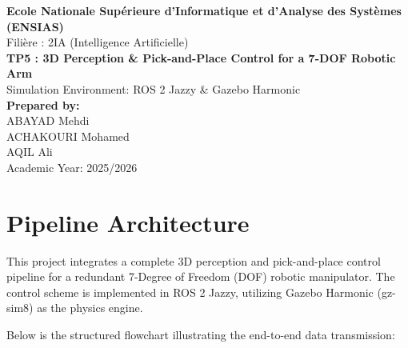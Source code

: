 \documentclass[12pt, a4paper]{article}
\begin{document}
\begin{titlepage}
    \centering
    \vspace*{1cm}
    {\Huge \bfseries Ecole Nationale Supérieure d'Informatique et d'Analyse des Systèmes (ENSIAS)} \\[0.4cm]
    {\large Filière : 2IA (Intelligence Artificielle)} \\[1.5cm]
    
    {\Large \bfseries TP5 : 3D Perception \& Pick-and-Place Control for a 7-DOF Robotic Arm} \\[0.5cm]
    {\large Simulation Environment: ROS 2 Jazzy \& Gazebo Harmonic} \\[2cm]
    
    \textbf{Prepared by:} \\[0.2cm]
    {\Large ABAYAD Mehdi} \\
    {\Large ACHAKOURI Mohamed} \\
    {\Large AQIL Ali} \\[2.5cm]
    
    \vfill
    {\large Academic Year: 2025/2026}
\end{titlepage}

\newpage
\tableofcontents
\newpage

\section{Pipeline Architecture}
This project integrates a complete 3D perception and pick-and-place control pipeline for a redundant 7-Degree of Freedom (DOF) robotic manipulator. The control scheme is implemented in ROS 2 Jazzy, utilizing Gazebo Harmonic (gz-sim8) as the physics engine.

Below is the structured flowchart illustrating the end-to-end data transmission:
\end{document}
